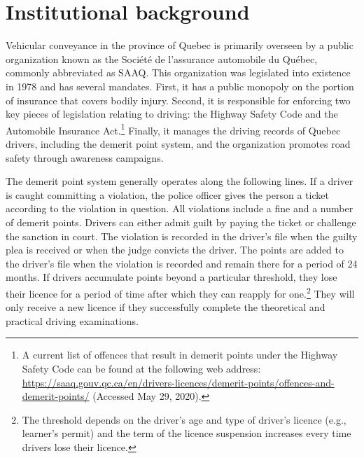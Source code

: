 \section{Institutional background}
\label{sec:Background}

Vehicular conveyance in the province of Quebec is primarily overseen by 
a public organization known as the Soci\'{e}t\'{e} de l'assurance automobile du Qu\'{e}bec, 
commonly abbreviated as SAAQ. 
This organization was legislated into existence in 1978 and has several mandates. 
First, it has a public monopoly on the portion of insurance that covers bodily injury. 
Second, it is responsible for enforcing two key pieces of legislation relating to driving: 
the Highway Safety Code and the Automobile Insurance Act.\footnote{%
%
A current list of offences that result in demerit points under the Highway Safety Code 
can be found at the following web address: 
\url{https://saaq.gouv.qc.ca/en/drivers-licences/demerit-points/offences-and-demerit-points/} (Accessed May 29, 2020).}
%
Finally, it manages the driving records of Quebec drivers, 
including the demerit point system, 
and the organization promotes road safety through awareness campaigns.

The demerit point system generally operates along the following lines. 
If a driver is caught committing a violation, the police officer 
gives the person a ticket according to the violation in question. 
All violations include a fine and a number of demerit points. 
Drivers can either admit guilt by paying the ticket or challenge the sanction in court. 
The violation is recorded in the driver’s file when the guilty plea is received 
or when the judge convicts the driver. 
The points are added to the driver’s file when the violation is recorded 
and remain there for a period of 24 months. 
If drivers accumulate points beyond a particular threshold, 
they lose their licence for a period of time 
after which they can reapply for one.\footnote{%
%
The threshold depends on the driver's age and type of driver’s licence 
(e.g., learner’s permit)
and the term of the licence suspension 
increases every time drivers lose their licence.}
%
They will only receive a new licence if they successfully complete 
the theoretical and practical driving examinations.




